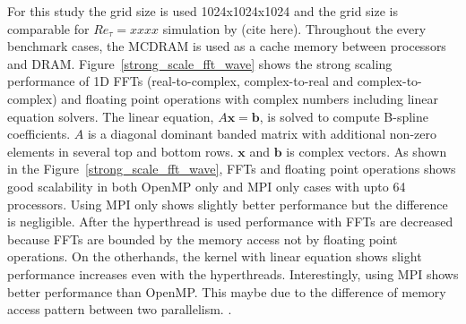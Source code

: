 For this study the grid size is used 1024x1024x1024 and the grid size is comparable for $Re_\tau = xxxx$ simulation by (cite here). Throughout the every benchmark cases, the MCDRAM is used as a cache memory between processors and DRAM. Figure~\ref{strong_scale_fft_wave} shows the strong scaling performance of 1D FFTs (real-to-complex, complex-to-real and complex-to-complex) and floating point operations with complex numbers including linear equation solvers. The linear equation, $A\mathbf{x} = \mathbf{b}$, is solved to compute B-spline coefficients. $A$ is a diagonal dominant banded matrix with additional non-zero elements in several top and bottom rows. $\mathbf{x}$ and $\mathbf{b}$ is complex vectors. As shown in the Figure~\ref{strong_scale_fft_wave}, FFTs and floating point operations shows good scalability in both OpenMP only and MPI only cases with upto 64 processors. Using MPI only shows slightly better performance but the difference is negligible. After the hyperthread is used performance with FFTs are decreased because FFTs are bounded by the memory access not by floating point operations. On the otherhands, the kernel with linear equation shows slight performance increases even with the hyperthreads. Interestingly, using MPI shows better performance than OpenMP. This maybe due to the difference of memory access pattern between two parallelism. .





